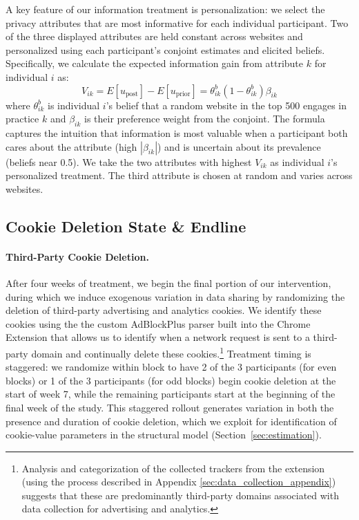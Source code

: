 \documentclass[12pt]{article}
\theoremstyle{definition}
\theoremstyle{remark}
\begin{document}
A key feature of our information treatment is personalization: we select the privacy attributes that are most informative for each individual participant. Two of the three displayed attributes are held constant across websites and personalized using each participant's conjoint estimates and elicited beliefs. Specifically, we calculate the expected information gain from attribute $k$ for individual $i$ as:
\begin{equation}\label{eq:provided_info}
    V_{ik} = E[u_{\text{post}}] - E[u_{\text{prior}}] = \theta^b_{ik}(1 - \theta^b_{ik})\beta_{ik}
\end{equation}
where $\theta^b_{ik}$ is individual $i$'s belief that a random website in the top 500 engages in practice $k$ and $\beta_{ik}$ is their preference weight from the conjoint. The formula captures the intuition that information is most valuable when a participant both cares about the attribute (high $|\beta_{ik}|$) and is uncertain about its prevalence (beliefs near 0.5). We take the two attributes with highest $V_{ik}$ as individual $i$'s personalized treatment. The third attribute is chosen at random and varies across websites.

\subsection{Cookie Deletion State \& Endline}

\paragraph{Third-Party Cookie Deletion.} After four weeks of treatment, we begin the final portion of our intervention, during which we induce exogenous variation in data sharing by randomizing the deletion of third-party advertising and analytics cookies. We identify these cookies using the the custom AdBlockPlus parser built into the Chrome Extension that allows us to identify when a network request is sent to a third-party domain and continually delete these cookies.\footnote{Analysis and categorization of the collected trackers from the extension (using the process described in Appendix \ref{sec:data_collection_appendix}) suggests that these are predominantly third-party domains associated with data collection for advertising and analytics.} Treatment timing is staggered: we randomize within block to have 2  of the 3 participants (for even blocks) or 1 of the 3 participants (for odd blocks) begin cookie deletion at the start of week 7, while the remaining participants start at the beginning of the final week of the study. This staggered rollout generates variation in both the presence and duration of cookie deletion, which we exploit for identification of cookie-value parameters in the structural model (Section~\ref{sec:estimation}).
\end{document}
